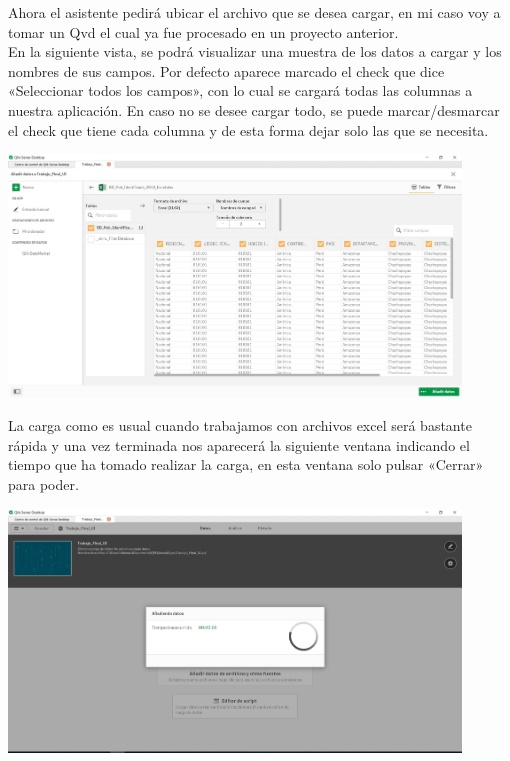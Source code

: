 Ahora el asistente pedirá ubicar el archivo que se desea cargar, en mi caso voy a tomar un Qvd el cual ya fue procesado en un proyecto anterior. \\
En la siguiente vista, se podrá visualizar una muestra de los datos a cargar y los nombres de sus campos.
Por defecto aparece marcado el check que dice «Seleccionar todos los campos», con lo cual se cargará todas las columnas a nuestra aplicación. En caso no se desee cargar todo, se puede marcar/desmarcar el check que tiene cada columna y de esta forma dejar solo las que se necesita.

\begin{center}
	\includegraphics[width=12cm]{./Imagenes/img12} 
\end{center}

La carga como es usual cuando trabajamos con archivos excel será bastante rápida y una vez terminada nos aparecerá la siguiente ventana indicando el tiempo que ha tomado realizar la carga, en esta ventana solo pulsar «Cerrar» para poder.

\begin{center}
	\includegraphics[width=12cm]{./Imagenes/img13} 
\end{center}

